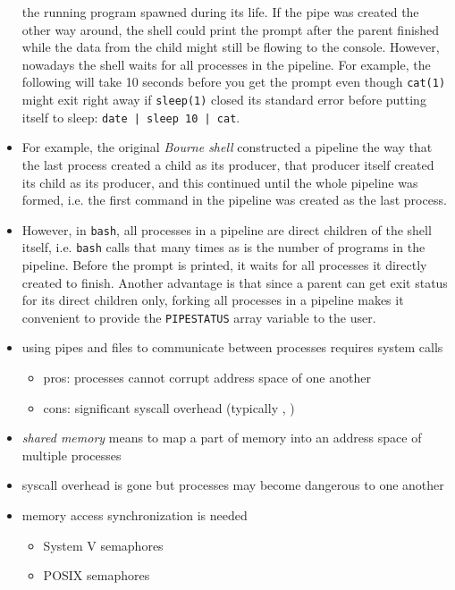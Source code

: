\begin{itemize}
the running program spawned during its life.  If the pipe was created the other
way around, the shell could print the prompt after the parent finished while the
data from the child might still be flowing to the console.  However, nowadays
the shell waits for all processes in the pipeline.  For example, the following
will take 10 seconds before you get the prompt even though \texttt{cat(1)} might
exit right away if \texttt{sleep(1)} closed its standard error before putting
itself to sleep: \texttt{date | sleep 10 | cat}.
\item For example, the original \emph{Bourne shell} constructed a pipeline the
way that the last process created a child as its producer, that producer itself
created its child as its producer, and this continued until the whole pipeline
was formed, i.e. the first command in the pipeline was created as the last
process.
\item However, in \texttt{bash}, all processes in a pipeline are direct children
of the shell itself, i.e. \texttt{bash} calls  that many times as is
the number of programs in the pipeline.  Before the prompt is printed, it waits
for all processes it directly created to finish.  Another advantage is that
since a parent can get exit status for its direct children only, forking all
processes in a pipeline makes it convenient to provide the \texttt{PIPESTATUS}
array variable to the user.
\end{itemize}


\begin{slide}
\begin{itemize}
\item using pipes and files to communicate between processes requires system
calls
\begin{itemize}
\item pros: processes cannot corrupt address space of one another
\item cons: significant syscall overhead (typically ,
)
\end{itemize}
\item \emph{shared memory} means to map a part of memory into an address space
of multiple processes
\item syscall overhead is gone but processes may become dangerous to one another
\item memory access synchronization is needed
\begin{itemize}
  \item System V semaphores
  \item POSIX semaphores
\end{itemize}
\end{itemize}
\end{slide}

